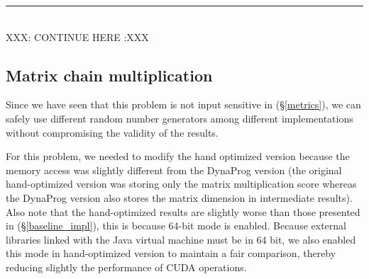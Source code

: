 \newpage
{\center\color{red} \noindent\rule{16cm}{0.4pt} \\ XXX: CONTINUE HERE :XXX \\}
\subsection{Matrix chain multiplication}
Since we have seen that this problem is not input sensitive in (\S\ref{metrics}), we can safely use different random number generators among different implementations without compromising the validity of the results.

For this problem, we needed to modify the hand optimized version because the memory access was slightly different from the DynaProg version (the original hand-optimized version was storing only the matrix multiplication score whereas the DynaProg version also stores the matrix dimension in intermediate results). Also note that the hand-optimized results are slightly worse than those presented in (\S\ref{baseline_impl}), this is because 64-bit mode is enabled. Because external libraries linked with the Java virtual machine must be in 64 bit, we also enabled this mode in hand-optimized version to maintain a fair comparison, thereby reducing slightly the performance of CUDA operations.

